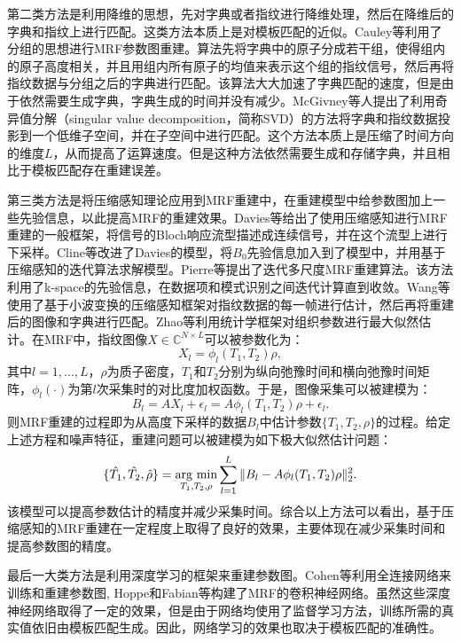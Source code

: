 第二类方法是利用降维的思想，先对字典或者指纹进行降维处理，然后在降维后的字典和指纹上进行匹配。这类方法本质上是对模板匹配的近似。Cauley\cite{groupingmrf}等利用了分组的思想进行MRF参数图重建。算法先将字典中的原子分成若干组，使得组内的原子高度相关，并且用组内所有原子的均值来表示这个组的指纹信号，然后再将指纹数据与分组之后的字典进行匹配。该算法大大加速了字典匹配的速度，但是由于依然需要生成字典，字典生成的时间并没有减少。McGivney\cite{svdmrf}等人提出了利用奇异值分解（singular value decomposition，简称SVD）的方法将字典和指纹数据投影到一个低维子空间，并在子空间中进行匹配。这个方法本质上是压缩了时间方向的维度$L$，从而提高了运算速度。但是这种方法依然需要生成和存储字典，并且相比于模板匹配存在重建误差。

第三类方法是将压缩感知理论应用到MRF重建中，在重建模型中给参数图加上一些先验信息，以此提高MRF的重建效果。Davies\cite{davies2014compressed}等给出了使用压缩感知进行MRF重建的一般框架，将信号的Bloch响应流型描述成连续信号，并在这个流型上进行下采样。Cline\cite{cline2017air}等改进了Davies的模型，将$B_0$先验信息加入到了模型中，并用基于压缩感知的迭代算法求解模型。Pierre\cite{multiscale}等提出了迭代多尺度MRF重建算法。该方法利用了k-space的先验信息，在数据项和模式识别之间迭代计算直到收敛。Wang\cite{wang2016magnetic}等使用了基于小波变换的压缩感知框架对指纹数据的每一帧进行估计，然后再将重建后的图像和字典进行匹配。Zhao等\cite{zhao2016maximum}利用统计学框架对组织参数进行最大似然估计。在MRF中，指纹图像$X\in \mathbb{C}^{N\times L}$可以被参数化为：
\begin{equation}
	X_l=\phi_l(T_1,T_2)\rho,
\end{equation}
其中$l=1,...,L$，$\rho$为质子密度，$T_1$和$T_2$分别为纵向弛豫时间和横向弛豫时间矩阵，$\phi_l(\cdot)$为第$l$次采集时的对比度加权函数。于是，图像采集可以被建模为：
\begin{equation}
	B_l=AX_l+\epsilon_l=A\phi_l(T_1,T_2)\rho+\epsilon_l.
\end{equation}
则MRF重建的过程即为从高度下采样的数据$B_l$中估计参数$\{T_1,T_2,\rho\}$的过程。给定上述方程和噪声特征，重建问题可以被建模为如下极大似然估计问题：
\begin{equation}
	\{\hat{T_1},\hat{T_2},\hat{\rho}\}=\argmin_{T_1,T_2,\rho}\sum_{l=1}^L\|B_l-A\phi_l(T_1,T_2)\rho\|_2^2.
\end{equation}
该模型可以提高参数估计的精度并减少采集时间。综合以上方法可以看出，基于压缩感知的MRF重建在一定程度上取得了良好的效果，主要体现在减少采集时间和提高参数图的精度。

最后一大类方法是利用深度学习的框架来重建参数图。Cohen\cite{cohen2018mr}等利用全连接网络来训练和重建参数图, Hoppe\cite{hoppe2017deep}和Fabian\cite{balsiger2018magnetic}等构建了MRF的卷积神经网络。虽然这些深度神经网络取得了一定的效果，但是由于网络均使用了监督学习方法，训练所需的真实值依旧由模板匹配生成。因此，网络学习的效果也取决于模板匹配的准确性。


